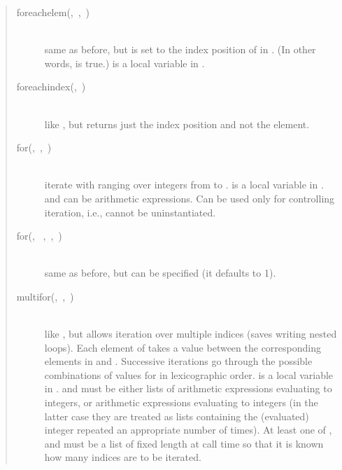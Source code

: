\begin{quote}
\begin{description}
\item[foreachelem(,~,~)]%
\mbox{}\\
    same as before, but  is set to the index position of  in
    . (In other words,  is
    true.)
     is a local variable in .

\item[foreachindex(,~)]%
\mbox{}\\
    like , but returns just the index position and not
    the element.

\item[for(,~,~)]%
\mbox{}\\
    iterate  with  ranging over integers from
     to .
     is a local variable in .
     and  can be arithmetic expressions.
    Can be used only for controlling iteration, i.e.,  cannot
    be uninstantiated.

\item[for(,%
~,~,~)]%
\mbox{}\\
    same as before, but  can be specified (it defaults to 1).

\item[multifor(,~,~)]%
\mbox{}\\
    like , but allows iteration over multiple indices (saves
    writing nested loops).  Each element of  takes a value
    between the corresponding elements in  and .
    Successive iterations go through the possible combinations of
    values for  in lexicographic order.   is a local
    variable in .
     and  must be either lists of
    arithmetic expressions evaluating to integers, or arithmetic
    expressions evaluating to integers (in the latter case they are
    treated as lists containing the (evaluated) integer repeated an
    appropriate number of times).  At least one of , 
    and
     must be a list of fixed length at call time so that it is
    known how many indices are to be iterated.


\end{description}
\end{quote}
